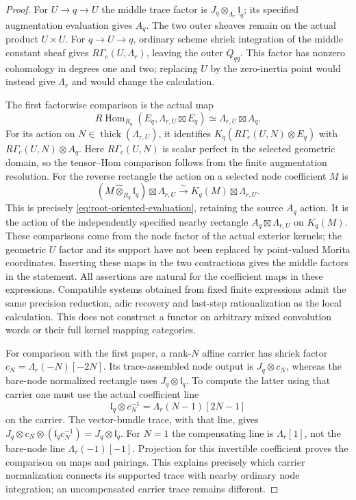 \documentclass[11pt]{article}
\theoremstyle{definition}
\theoremstyle{remark}
\newcommand{\RHom}{R\operatorname{Hom}}
\begin{document}
\begin{proof}
For $U\to q\to U$ the middle trace factor is
$J_q\otimes_{\Lambda_r}\underline{\mathfrak l}_q$; its specified
augmentation evaluation gives $A_q$.  The two outer sheaves remain
on the actual product $U\times U$.  For $q\to U\to q$, ordinary
scheme shriek integration of the middle constant sheaf gives
$R\Gamma_c(U,\Lambda_r)$, leaving the outer $Q_{qq}$.  This factor
has nonzero cohomology in degrees one and two; replacing $U$ by the
zero-inertia point would instead give $\Lambda_r$ and would change
the calculation.

The first factorwise comparison is the actual map
\[
 \RHom_{R_q}(E_q,\Lambda_{r,U}\boxtimes E_q)
       \simeq\Lambda_{r,U}\boxtimes A_q.
\]
For its action on $N\in\operatorname{thick}(\Lambda_{r,U})$, it identifies
$K_q(R\Gamma_c(U,N)\otimes E_q)$ with
$R\Gamma_c(U,N)\otimes A_q$.  Here $R\Gamma_c(U,N)$ is scalar
perfect in the selected geometric domain, so the tensor--Hom
comparison follows from the finite augmentation resolution.
For the reverse rectangle the action on a selected node coefficient
$M$ is
\[
 (M\widehat\otimes_{R_q}\mathfrak l_q)\boxtimes\Lambda_{r,U}
       \xrightarrow{\sim}K_q(M)\boxtimes\Lambda_{r,U}.
\]
This is precisely \eqref{eq:root-oriented-evaluation}, retaining
the source $A_q$ action.  It is the action of the independently
specified nearby rectangle $A_q\boxtimes\Lambda_{r,U}$ on $K_q(M)$.
These comparisons come from the node factor of the actual exterior
kernels; the geometric $U$ factor and its support have not been
replaced by point-valued Morita coordinates.  Inserting these maps
in the two contractions gives the middle factors in the statement.
All assertions are natural for the coefficient maps in these
expressions.  Compatible systems obtained from fixed finite
expressions admit the same precision reduction, adic recovery and
last-step rationalization as the local calculation.  This does not
construct a functor on arbitrary mixed convolution words or their
full kernel mapping categories.

For comparison with the first paper, a rank-$N$ affine carrier has
shriek factor $c_N=\Lambda_r(-N)[-2N]$.  Its trace-assembled node
output is $J_q\otimes c_N$, whereas the bare-node normalized
rectangle uses $J_q\otimes\mathfrak l_q$.  To compute the latter
using that carrier one must use the actual coefficient line
\begin{equation}
 \mathfrak l_q\otimes c_N^{-1}
       =\Lambda_r(N-1)[2N-1]
 \label{eq:root-carrier-compensation}
\end{equation}
on the carrier.  The vector-bundle trace, with that line, gives
$J_q\otimes c_N\otimes(\mathfrak l_q c_N^{-1})
=J_q\otimes\mathfrak l_q$.  For $N=1$ the compensating line is
$\Lambda_r[1]$, not the bare-node line $\Lambda_r(-1)[-1]$.
Projection for this invertible coefficient proves the comparison
on maps and pairings.  This explains precisely which carrier
normalization connects its supported trace with nearby ordinary
node integration; an uncompensated carrier trace remains different.
\end{proof}
\end{document}

